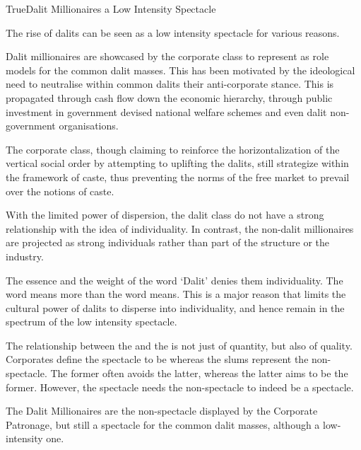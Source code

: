 \documentclass[11pt]{article}
\begin{document}
\begin{heading}{True}{}{Dalit Millionaires a Low Intensity Spectacle}

	The rise of dalits can be seen as a low intensity spectacle for various reasons.

	\begin{enumerate}[label=\bt{\theenumi.}]


		Dalit millionaires are showcased by the corporate class to represent as role models for the common dalit masses. This has been motivated by the ideological need to neutralise within common dalits their anti-corporate stance. This is propagated through cash flow down the economic hierarchy, through public investment in government devised national welfare schemes and even dalit non-government organisations.

		The corporate class, though claiming to reinforce the horizontalization of the vertical social order by attempting to uplifting the dalits, still strategize within the framework of caste, thus preventing the norms of the free market to prevail over the notions of caste.


		With the limited power of dispersion, the dalit class do not have a strong relationship with the idea of individuality. In contrast, the non-dalit millionaires are projected as strong individuals rather than part of the structure or the industry.

		The essence and the weight of the word `Dalit’ denies them individuality. The word  means more than the word  means. This is a major reason that limits the cultural power of dalits to disperse into individuality, and hence remain in the spectrum of the low intensity spectacle.


		The relationship between the  and the  is not just of quantity, but also of quality. Corporates define the spectacle to be  whereas the slums represent the non-spectacle. The former often avoids the latter, whereas the latter aims to be the former. However, the spectacle needs the non-spectacle to indeed be a spectacle.

		The Dalit Millionaires are the non-spectacle displayed by the Corporate Patronage, but still a spectacle for the common dalit masses, although a low-intensity one.


\end{enumerate}
\end{heading}
\end{document}
